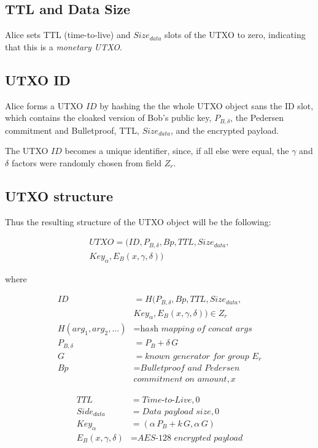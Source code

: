 \documentclass[8pt,fleqn,openany]{book}
\begin{document}
\subsection{TTL and Data Size} Alice sets TTL (time-to-live) and $Size_{data}$ slots of the UTXO to zero, indicating that this is a \textit{monetary UTXO}. 

\subsection{UTXO ID} Alice forms a UTXO $\mathit{ID}$ by hashing the the whole UTXO object sans the ID slot, which contains the cloaked version of Bob’s public key, $P_{B, \delta}$, the Pedersen commitment and Bulletproof, TTL, $Size_{data}$, and the encrypted payload.

The UTXO $\mathit{ID}$ becomes a unique identifier, since, if all else were equal, the $\gamma$ and $\delta$ factors were randomly chosen from field $Z_r$.

\subsection{UTXO structure}
Thus the resulting structure of the UTXO object will be the following:

\begin{multline*}
UTXO = (ID, P_{B, \delta}, Bp, TTL, Size_{data},\\
        Key_{\alpha}, E_B(x, \gamma, \delta))
\end{multline*}

where

\begin{align*}
ID &= H(P_{B, \delta}, Bp, TTL, Size_{data}, \\ 
   & Key_{\alpha}, E_B(x, \gamma, \delta)) \in Z_r \\
H(arg_1, arg_2, ...) &= \textit{hash mapping of concat args} \\
P_{B, \delta} &= P_B + \delta \, G \\
G &= \textit{known generator for group } E_r \\
Bp &= \textit{Bulletproof and Pedersen} \\
& \textit{commitment on amount}, x 
\end{align*}

\begin{align*}
TTL &= \textit{Time-to-Live}, 0 \\
Side_{data} &= \textit{Data payload size}, 0 \\
Key_{\alpha} &= (\alpha \, P_{B} + k \, G, \alpha \, G ) \\
E_B(x, \gamma, \delta) &= \textit{AES-128 encrypted payload}
\end{align*}
\end{document}
